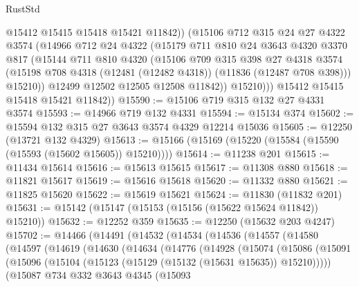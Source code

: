 \begin{lexlean}{RustStd}
\begin{coremodule}
                @15412
                @15415
                @15418
                @15421
                @11842))
            (@15106
              @712
              @315
              @24
              @27
              @4322
              @3574
              (@14966
                @712
                @24
                @4322
                (@15179
                  @711
                  @810
                  @24
                  @3643
                  @4320
                  @3370
                  @817
                  (@15144
                    @711
                    @810
                    @4320
                    (@15106
                      @709
                      @315
                      @398
                      @27
                      @4318
                      @3574
                      (@15198 @708 @4318 (@12481 (@12482 @4318)) (@11836 (@12487 @708 @398)))
                      @15210))
                  @12499
                  @12502
                  @12505
                  @12508
                  @11842))
              @15210)))
        @15412
        @15415
        @15418
        @15421
        @11842))
@15590 := @15106 @719 @315 @132 @27 @4331 @3574
@15593 := @14966 @719 @132 @4331
@15594 := @15134 @374
@15602 := @15594 @132 @315 @27 @3643 @3574 @4329 @12214 @15036
@15605 := @12250 (@13721 @132 @4329)
@15613 := @15166 (@15169 (@15220 (@15584 (@15590 (@15593 (@15602 @15605)) @15210))))
@15614 := @11238 @201
@15615 := @11434 @15614
@15616 := @15613 @15615
@15617 := @11308 @880
@15618 := @11821 @15617
@15619 := @15616 @15618
@15620 := @11332 @880
@15621 := @11825 @15620
@15622 := @15619 @15621
@15624 := @11830 (@11832 @201)
@15631 := @15142 (@15147 (@15153 (@15156 (@15622 @15624 @11842)) @15210))
@15632 := @12252 @359
@15635 := @12250 (@15632 @203 @4247)
@15702 := @14466
    (@14491
      (@14532
        (@14534
          (@14536
            (@14557
              (@14580
                (@14597
                  (@14619
                    (@14630
                      (@14634
                        (@14776
                          (@14928
                            (@15074
                              (@15086
                                (@15091
                                  (@15096
                                    (@15104 (@15123 (@15129 (@15132 (@15631 @15635)) @15210)))))
                                (@15087
                                  @734
                                  @332
                                  @3643
                                  @4345
                                  (@15093

\end{coremodule}
\end{lexlean}
